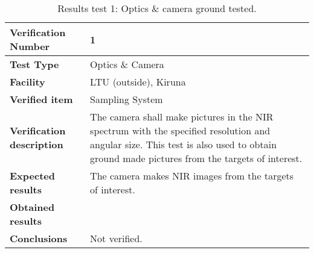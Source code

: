 \begin{table}[H]
\centering

\begin{tabular}{|m{}| m{} |}
\hline
\textbf{Verification Number} 		& 1 					\\ \hline
\textbf{Test Type} 					& Optics \& Camera		\\ \hline
\textbf{Facility} 					& LTU (outside), Kiruna \\ \hline
\textbf{Verified item} 				& Sampling System 		\\ \hline

\textbf{Verification description} 	& The camera shall make pictures in the NIR spectrum with the specified resolution and angular size. This test is also used to obtain ground made pictures from the targets of interest.\\ \hline

\textbf{Expected results} 			& The camera makes NIR images from the targets of interest.\\ \hline

\textbf{Obtained results} 			& \\ \hline

\textbf{Conclusions} 				& Not verified.			\\ \hline
\end{tabular}
\caption{Results test 1: Optics \& camera ground tested.}
\label{tab:testresult1:camera-optics}
\end{table}


\raggedbottom
